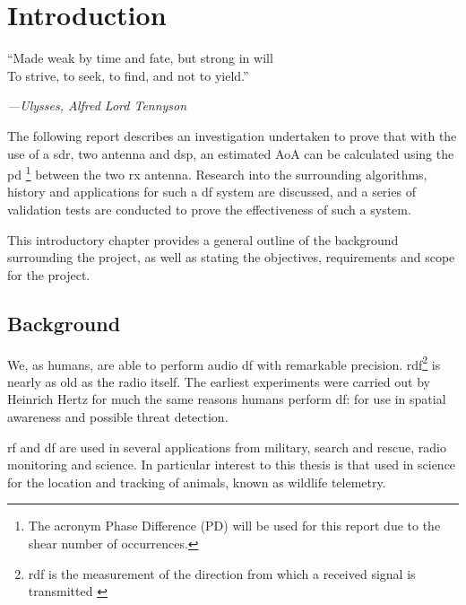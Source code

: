 \documentclass[class=report,11pt,crop=false]{standalone}
\begin{document}
\chapter{Introduction \label{ch:intro}}
\epigraph{“Made weak by time and fate, but strong in will\\
To strive, to seek, to find, and not to yield.”}
    {\emph{---Ulysses, Alfred Lord Tennyson}}
\vspace{0.5cm}

The following report describes an investigation undertaken to prove that with the use of a \gls{sdr}, two antenna and \gls{dsp}, an estimated \gls{AoA} can be calculated using the \gls{pd} \footnote{The acronym Phase Difference (PD) will be used for this report due to the shear number of occurrences.} between the two \gls{rx} antenna. Research into the surrounding algorithms, history and applications for such a \gls{df} system are discussed, and a series of validation tests are conducted to prove the effectiveness of such a system.  

This introductory chapter provides a general outline of the background surrounding the project, as well as stating the objectives, requirements and scope for the project. 

\section{Background}

We, as humans, are able to perform audio \gls{df} with remarkable precision. \gls{rdf}\footnote{\gls{rdf} is the measurement of the direction from which a received signal is transmitted \cite{rdf-advantage-of-sdr}} is nearly as old as the radio itself. The earliest experiments were carried out by Heinrich Hertz \cite{hertz-expeirments} for much the same reasons humans perform \gls{df}: for use in spatial awareness and possible threat detection. 

\gls{rf} and \gls{df} are used in several applications from military, search and rescue, radio monitoring and science. In particular interest to this thesis is that used in science for the location and tracking of animals, known as wildlife telemetry. 
\end{document}
